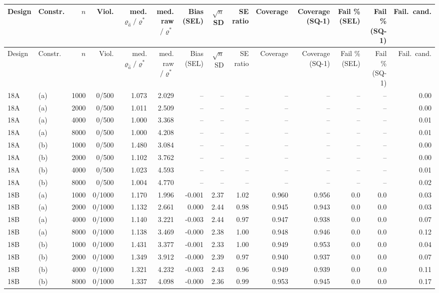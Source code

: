 \begin{tabular}{llrrrrrrrrrrrr}
\hline
Design & Constr. & $n$ & Viol. & med. $\varrho_{\widehat a}/\varrho^*$ & med. raw$/\varrho^*$ & Bias (SEL) & $\sqrt n$SD & SE ratio & Coverage & Coverage (SQ-1) & Fail \% (SEL) & Fail \% (SQ-1) & Fail.\ cand. \\
\hline
\endfirsthead
\hline
Design & Constr. & $n$ & Viol. & med. $\varrho_{\widehat a}/\varrho^*$ & med. raw$/\varrho^*$ & Bias (SEL) & $\sqrt n$SD & SE ratio & Coverage & Coverage (SQ-1) & Fail \% (SEL) & Fail \% (SQ-1) & Fail.\ cand. \\
\hline
\endhead
18A & (a) & 1000 & 0/500 & 1.073 & 2.029 & -- & -- & -- & -- & -- & -- & -- & 0.00 \\
18A & (a) & 2000 & 0/500 & 1.011 & 2.509 & -- & -- & -- & -- & -- & -- & -- & 0.00 \\
18A & (a) & 4000 & 0/500 & 1.000 & 3.368 & -- & -- & -- & -- & -- & -- & -- & 0.01 \\
18A & (a) & 8000 & 0/500 & 1.000 & 4.208 & -- & -- & -- & -- & -- & -- & -- & 0.01 \\
18A & (b) & 1000 & 0/500 & 1.480 & 3.084 & -- & -- & -- & -- & -- & -- & -- & 0.00 \\
18A & (b) & 2000 & 0/500 & 1.102 & 3.762 & -- & -- & -- & -- & -- & -- & -- & 0.00 \\
18A & (b) & 4000 & 0/500 & 1.023 & 4.593 & -- & -- & -- & -- & -- & -- & -- & 0.01 \\
18A & (b) & 8000 & 0/500 & 1.004 & 4.770 & -- & -- & -- & -- & -- & -- & -- & 0.02 \\
18B & (a) & 1000 & 0/1000 & 1.170 & 1.996 & -0.001 & 2.37 & 1.02 & 0.960 & 0.956 & 0.0 & 0.0 & 0.03 \\
18B & (a) & 2000 & 0/1000 & 1.132 & 2.661 & 0.000 & 2.44 & 0.98 & 0.945 & 0.943 & 0.0 & 0.0 & 0.03 \\
18B & (a) & 4000 & 0/1000 & 1.140 & 3.221 & -0.003 & 2.44 & 0.97 & 0.947 & 0.938 & 0.0 & 0.0 & 0.07 \\
18B & (a) & 8000 & 0/1000 & 1.138 & 3.469 & -0.000 & 2.38 & 1.00 & 0.948 & 0.946 & 0.0 & 0.0 & 0.12 \\
18B & (b) & 1000 & 0/1000 & 1.431 & 3.377 & -0.001 & 2.33 & 1.00 & 0.949 & 0.953 & 0.0 & 0.0 & 0.04 \\
18B & (b) & 2000 & 0/1000 & 1.349 & 3.912 & -0.000 & 2.39 & 0.97 & 0.940 & 0.937 & 0.0 & 0.0 & 0.07 \\
18B & (b) & 4000 & 0/1000 & 1.321 & 4.232 & -0.003 & 2.43 & 0.96 & 0.949 & 0.939 & 0.0 & 0.0 & 0.11 \\
18B & (b) & 8000 & 0/1000 & 1.337 & 4.098 & -0.000 & 2.36 & 0.99 & 0.953 & 0.945 & 0.0 & 0.0 & 0.17 \\
\hline
\end{tabular}
